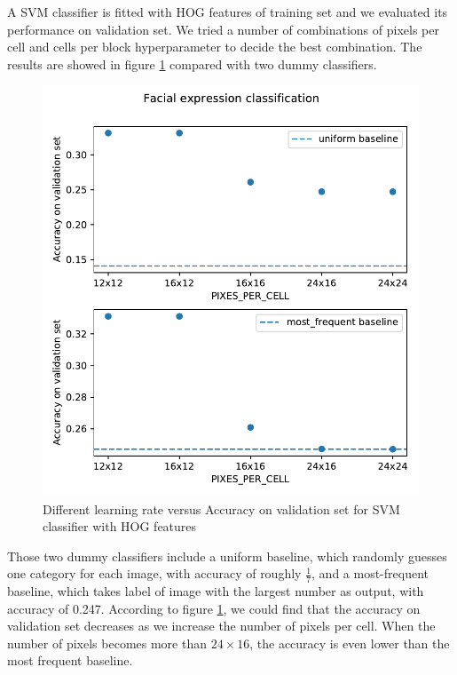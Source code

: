 \documentclass{article}
\begin{document}
A SVM classifier is fitted with HOG features of training set and we evaluated its performance on validation set. We tried a number of combinations of pixels per cell and cells per block hyperparameter to decide the best combination. The results are showed in figure \ref{fig:SVM_HOG_Feature} compared with two dummy classifiers.

\begin{figure}[htp]
    \centering
    \includegraphics[width=\columnwidth]{figures/SVM}
    \caption{Different learning rate versus Accuracy on validation set for SVM classifier with HOG features}
    \label{fig:SVM_HOG_Feature}
\end{figure}

Those two dummy classifiers include a uniform baseline, which randomly guesses one category for each image, with accuracy of roughly $\frac{1}{7}$, and a most-frequent baseline, which takes label of image with the largest number as output, with accuracy of 0.247. According to figure \ref{fig:SVM_HOG_Feature}, we could find that the accuracy on validation set decreases as we increase the number of pixels per cell. When the number of pixels becomes more than $24\times16$, the accuracy is even lower than the most frequent baseline. 
\end{document}
